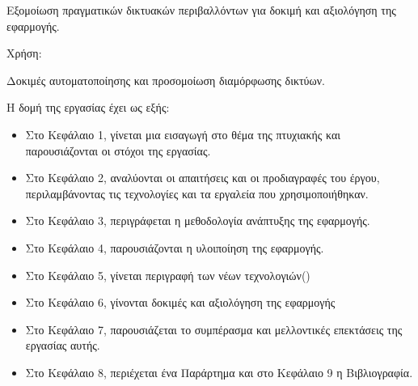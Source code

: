 Εξομοίωση πραγματικών δικτυακών περιβαλλόντων για δοκιμή και αξιολόγηση της εφαρμογής.

Χρήση: 

Δοκιμές αυτοματοποίησης και προσομοίωση διαμόρφωσης δικτύων.


Η δομή της εργασίας έχει ως εξής:
\begin{itemize}
    \item Στο Κεφάλαιο 1, γίνεται μια εισαγωγή στο θέμα της πτυχιακής και παρουσιάζονται οι στόχοι της εργασίας.
    \item Στο Κεφάλαιο 2, αναλύονται οι απαιτήσεις και οι προδιαγραφές του έργου, περιλαμβάνοντας τις τεχνολογίες και τα εργαλεία που χρησιμοποιήθηκαν.
    \item Στο Κεφάλαιο 3, περιγράφεται η μεθοδολογία ανάπτυξης της εφαρμογής.
    \item Στο Κεφάλαιο 4, παρουσιάζονται η υλοιποίηση της εφαρμογής.
    \item Στο Κεφάλαιο 5, γίνεται περιγραφή των νέων τεχνολογιών()
    \item Στο Κεφάλαιο 6, γίνονται δοκιμές και αξιολόγηση της εφαρμογής
    \item Στο Κεφάλαιο 7, παρουσιάζεται το συμπέρασμα και μελλοντικές επεκτάσεις της εργασίας αυτής.
    \item Στο Κεφάλαιο 8, περιέχεται ένα Παράρτημα και στο Κεφάλαιο 9 η Βιβλιογραφία.
\end{itemize}